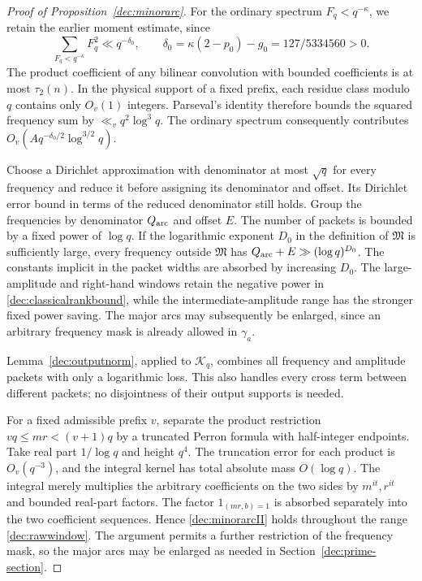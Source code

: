 \documentclass[11pt,a4paper]{article}
\theoremstyle{paperplain}
\numberwithin{equation}{section}
\begin{document}
\begin{proof}[Proof of Proposition~\ref{dec:minorarc}]
For the ordinary spectrum $F_q<q^{-\kappa}$, we retain the earlier
moment estimate, since
\begin{equation}\label{dec:ordinary}
 \sum_{F_q<q^{-\kappa}}F_q^2
 \ll q^{-\delta_0},\qquad
 \delta_0=\kappa(2-p_0)-g_0=127/5334560>0.
\end{equation}
The product coefficient of any bilinear convolution with bounded
coefficients is at most $\tau_2(n)$. In the physical support of a fixed
prefix, each residue class modulo $q$ contains only $O_v(1)$ integers.
Parseval's identity therefore bounds the squared frequency sum by
$\ll_vq^2\log^3q$. The ordinary spectrum consequently contributes
$O_v(Aq^{-\delta_0/2}\log^{3/2}q)$.

Choose a Dirichlet approximation with denominator at most $\sqrt q$
for every frequency and reduce it before assigning its denominator and
offset. Its Dirichlet error bound in terms of the reduced denominator
still holds. Group the frequencies by denominator
$Q_{\rm arc}$ and offset $E$. The number of packets is bounded by
a fixed power of $\log q$. If the logarithmic exponent $D_0$ in the definition of
$\mathfrak M$ is sufficiently large, every frequency outside
$\mathfrak M$ has $Q_{\rm arc}+E\gg(\log q)^{D_0}$.
The constants implicit in the packet widths are absorbed by increasing
$D_0$.
The large-amplitude and right-hand windows retain the negative power
in \eqref{dec:classicalrankbound}, while the intermediate-amplitude
range has the stronger fixed power saving.
The major arcs may subsequently be enlarged, since an arbitrary
frequency mask is already allowed in $\gamma_a$.

Lemma~\ref{dec:outputnorm}, applied to $\mathcal K_q$, combines
all frequency and amplitude packets with only a logarithmic loss.
This also handles every cross term between different packets;
no disjointness of their output supports is needed.

For a fixed admissible prefix $v$, separate the product restriction
$vq\le mr<(v+1)q$ by a truncated Perron formula with half-integer
endpoints. Take real part $1/\log q$ and height $q^4$.
The truncation error for each product is $O_v(q^{-3})$, and the
integral kernel has total absolute mass $O(\log q)$.
The integral merely multiplies the arbitrary coefficients on the two
sides by $m^{it},r^{it}$ and bounded real-part factors.
The factor $1_{(mr,b)=1}$ is absorbed separately into the two coefficient
sequences. Hence \eqref{dec:minorarcII} holds throughout the range
\eqref{dec:rawwindow}. The argument permits a further restriction of
the frequency mask, so the major arcs may be enlarged as needed in
Section~\ref{dec:prime-section}.
\end{proof}
\end{document}
